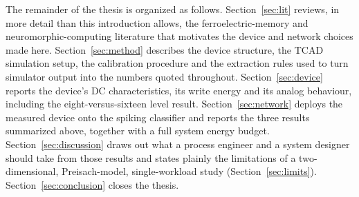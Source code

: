 The remainder of the thesis is organized as follows. Section~\ref{sec:lit} reviews,
in more detail than this introduction allows, the ferroelectric-memory and
neuromorphic-computing literature that motivates the device and network choices made
here. Section~\ref{sec:method} describes the device structure, the TCAD simulation
setup, the calibration procedure and the extraction rules used to turn simulator
output into the numbers quoted throughout. Section~\ref{sec:device} reports the
device's DC characteristics, its write energy and its analog behaviour, including
the eight-versus-sixteen level result. Section~\ref{sec:network} deploys the
measured device onto the spiking classifier and reports the three results summarized
above, together with a full system energy budget. Section~\ref{sec:discussion} draws
out what a process engineer and a system designer should take from those results and
states plainly the limitations of a two-dimensional, Preisach-model, single-workload
study (Section~\ref{sec:limits}). Section~\ref{sec:conclusion} closes the thesis.
